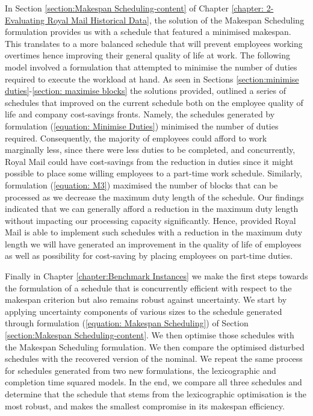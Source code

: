 \vspace{\baselineskip}
\noindent
In Section \ref{section:Makespan Scheduling-content} of Chapter \ref{chapter: 2-Evaluating Royal Mail Historical Data}, the solution of the Makespan Scheduling formulation provides us with a schedule that featured a minimised makespan. This translates to a more balanced schedule that will prevent employees working overtimes hence improving their general quality of life at work. The following model involved a formulation that attempted to minimise the number of duties required to execute the workload at hand. As seen in Sections \ref{section:minimise duties}-\ref{section: maximise blocks} the solutions provided, outlined a series of schedules that improved on the current schedule both on the employee quality of life and company cost-savings fronts. Namely, the schedules generated by formulation (\ref{equation: Minimise Duties}) minimised the number of duties required. Consequently, the majority of employees could afford to work marginally less, since there were less duties to be completed, and concurrently, Royal Mail could have cost-savings from the reduction in duties since it might possible to place some willing employees to a part-time work schedule. Similarly, formulation (\ref{equation: M3}) maximised the number of blocks that can be processed as we decrease the maximum duty length of the schedule. Our findings indicated that we can generally afford a reduction in the maximum duty length without impacting our processing capacity significantly. Hence, provided Royal Mail is able to implement such schedules with a reduction in the maximum duty length we will have generated an improvement in the quality of life of employees as well as possibility for cost-saving by placing employees on part-time duties.

\vspace{\baselineskip}
\noindent
Finally in Chapter \ref{chapter:Benchmark Instances} we make the first steps towards the formulation of a schedule that is concurrently efficient with respect to the makespan criterion but also remains robust against uncertainty. We start by applying uncertainty components of various sizes to the schedule generated through formulation (\ref{equation: Makespan Scheduling}) of Section \ref{section:Makespan Scheduling-content}. We then optimise those schedules with the Makespan Scheduling formulation. We then compare the optimised disturbed schedules with the recovered version of the nominal. We repeat the same process for schedules generated from two new formulations, the lexicographic and completion time squared models. In the end, we compare all three schedules and determine that the schedule that stems from the lexicographic optimisation is the most robust, and makes the smallest compromise in its makespan efficiency. 

